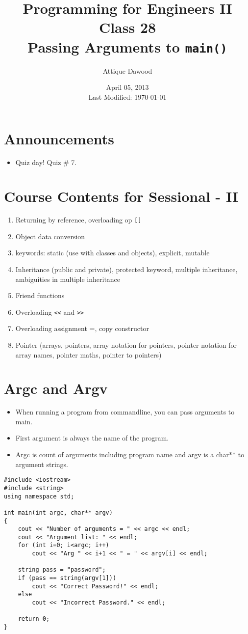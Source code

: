 \documentclass[12pt,a4paper]{article}
\title{\vspace{-2cm}Programming for Engineers II\\Class 28\\Passing Arguments to \texttt{main()}}
\author{Attique Dawood}
\date{April 05, 2013\\[0.2cm] Last Modified: \today}
\begin{document}
\maketitle
\section{Announcements}
\begin{itemize}
\item Quiz day! Quiz \# 7.
\end{itemize}
\section{Course Contents for Sessional - II}
\begin{enumerate}
\item Returning by reference, overloading op \verb|[]|
\item Object data conversion
\item keywords: static (use with classes and objects), explicit, mutable
\item Inheritance (public and private), protected keyword, multiple inheritance, ambiguities in multiple inheritance
\item Friend functions
\item Overloading \verb|<<| and \verb|>>|
\item Overloading assignment =, copy constructor
\item Pointer (arrays, pointers, array notation for pointers, pointer notation for array names, pointer maths, pointer to pointers)
\end{enumerate}
\section{Argc and Argv}
\begin{itemize}
\item When running a program from commandline, you can pass arguments to main.
\item First argument is always the name of the program.
\item Argc is count of arguments including program name and argv is a char** to argument strings.
\end{itemize}
\begin{lstlisting}[caption={Passing Arguments to main()}]
#include <iostream>
#include <string>
using namespace std;

int main(int argc, char** argv)
{
	cout << "Number of arguments = " << argc << endl;
	cout << "Argument list: " << endl;
	for (int i=0; i<argc; i++)
		cout << "Arg " << i+1 << " = " << argv[i] << endl;

	string pass = "password";
	if (pass == string(argv[1]))
		cout << "Correct Password!" << endl;
	else
		cout << "Incorrect Password." << endl;

	return 0;
}
\end{lstlisting}
\end{document}

